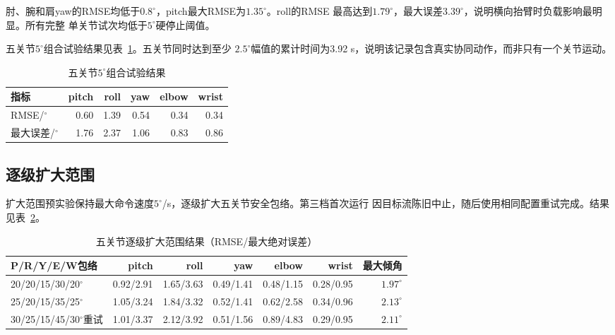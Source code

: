 肘、腕和肩yaw的RMSE均低于$0.8^\circ$，pitch最大RMSE为$1.35^\circ$。roll的RMSE
最高达到$1.79^\circ$，最大误差$3.39^\circ$，说明横向抬臂时负载影响最明显。所有完整
单关节试次均低于$5^\circ$硬停止阈值。

五关节$5^\circ$组合试验结果见表~\ref{tab:ch7_five_joint_small}。五关节同时达到至少
$2.5^\circ$幅值的累计时间为3.92 s，说明该记录包含真实协同动作，而非只有一个关节运动。

\begin{table}[htbp]
  \centering
  \caption{五关节$5^\circ$组合试验结果}
  \label{tab:ch7_five_joint_small}
  \begin{tabular}{@{}lrrrrr@{}}
    \toprule
    指标 & pitch & roll & yaw & elbow & wrist \\
    \midrule
    RMSE/$^\circ$ & 0.60 & 1.39 & 0.54 & 0.34 & 0.34 \\
    最大误差/$^\circ$ & 1.76 & 2.37 & 1.06 & 0.83 & 0.86 \\
    \bottomrule
  \end{tabular}
\end{table}

\subsection{逐级扩大范围}
\label{subsec:ch7_range_expansion}

扩大范围预实验保持最大命令速度$5^\circ$/s，逐级扩大五关节安全包络。第三档首次运行
因目标流陈旧中止，随后使用相同配置重试完成。结果见表~\ref{tab:ch7_range_expansion}。

\begin{table}[htbp]
  \centering
  \scriptsize
  \caption{五关节逐级扩大范围结果（RMSE/最大绝对误差）}
  \label{tab:ch7_range_expansion}
  \begin{tabularx}{\linewidth}{@{}Xrrrrrr@{}}
    \toprule
    P/R/Y/E/W包络 & pitch & roll & yaw & elbow & wrist & 最大倾角 \\
    \midrule
    20/20/15/30/20$^\circ$
      & 0.92/2.91 & 1.65/3.63 & 0.49/1.41 & 0.48/1.15 & 0.28/0.95 & $1.97^\circ$ \\
    25/20/15/35/25$^\circ$
      & 1.05/3.24 & 1.84/3.32 & 0.52/1.41 & 0.62/2.58 & 0.34/0.96 & $2.13^\circ$ \\
    30/25/15/45/30$^\circ$重试
      & 1.01/3.37 & 2.12/3.92 & 0.51/1.56 & 0.89/4.83 & 0.29/0.95 & $2.11^\circ$ \\
    \bottomrule
  \end{tabularx}
\end{table}

